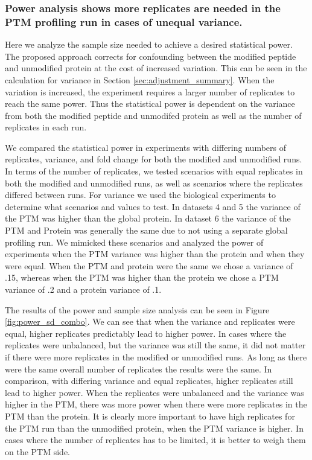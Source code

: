 \documentclass[mcp]{article}
\numberwithin{figure}{section} %
\numberwithin{table}{section}
\begin{document}
\subsubsection*{Power analysis shows more replicates are needed in the PTM profiling run in cases of unequal variance.}

Here we analyze the sample size needed to achieve a desired statistical power. The proposed approach corrects for confounding between the modified peptide and unmodified protein at the cost of increased variation. This can be seen in the calculation for variance in Section \ref{sec:adjustment_summary}. When the variation is increased, the experiment requires a larger number of replicates to reach the same power. Thus the statistical power is dependent on the variance from both the modified peptide and unmodifed protein as well as the number of replicates in each run.

We compared the statistical power in experiments with differing numbers of replicates, variance, and fold change for both the modified and unmodified runs. In terms of the number of replicates, we tested scenarios with equal replicates in both the modified and unmodified runs, as well as scenarios where the replicates differed between runs. For variance we used the biological experiments to determine what scenarios and values to test. In datasets 4 and 5 the variance of the PTM was higher than the global protein. In dataset 6 the variance of the PTM and Protein was generally the same due to not using a separate global profiling run. We mimicked these scenarios and analyzed the power of experiments when the PTM variance was higher than the protein and when they were equal. When the PTM and protein were the same we chose a variance of .15, whereas when the PTM was higher than the protein we chose a PTM variance of .2 and a protein variance of .1.

The results of the power and sample size analysis can be seen in Figure \ref{fig:power_sd_combo}. We can see that when the variance and replicates were equal, higher replicates predictably lead to higher power. In cases where the replicates were unbalanced, but the variance was still the same, it did not matter if there were more replicates in the modified or unmodified runs. As long as there were the same overall number of replicates the results were the same. In comparison, with differing variance and equal replicates, higher replicates still lead to higher power. When the replicates were unbalanced and the variance was higher in the PTM, there was more power when there were more replicates in the PTM than the protein. It is clearly more important to have high replicates for the PTM run than the unmodified protein, when the PTM variance is higher. In cases where the number of replicates has to be limited, it is better to weigh them on the PTM side.
\end{document}
